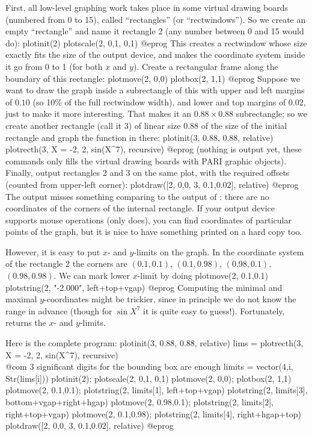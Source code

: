 First, all low-level graphing work takes place in some virtual drawing
boards (numbered from 0 to 15), called ``rectangles'' (or ``rectwindows'').
So we create an empty ``rectangle'' and name it rectangle 2 (any
number between 0 and 15 would do):
\bprog
plotinit(2)
plotscale(2, 0,1, 0,1)
@eprog
This creates a rectwindow whose size exactly fits the size of the output
device, and makes the coordinate system inside it go from 0 to 1 (for both
$x$ and $y$). Create a rectangular frame along the boundary of this rectangle:
\bprog
plotmove(2, 0,0)
plotbox(2, 1,1)
@eprog
Suppose we want to draw the graph inside a subrectangle of this with upper
and left margins of $0.10$ (so 10\% of the full rectwindow width), and
lower and top margins of $0.02$, just to make it more interesting. That
makes it an $0.88 \times 0.88$ subrectangle; so we create another rectangle
(call it 3) of linear size 0.88 of the size of the initial rectangle and
graph the function in there:
\bprog
plotinit(3, 0.88, 0.88, relative)
plotrecth(3, X = -2, 2, sin(X^7), recursive)
@eprog
(nothing is output yet, these commands only fills the virtual drawing
boards with PARI graphic objects). Finally, output rectangles 2 and 3 on
the same plot, with the required offsets (counted from upper-left corner):
\bprog
plotdraw([2, 0,0,  3, 0.1,0.02], relative)
@eprog
\noindent The output misses something comparing to the output of
: there are no coordinates of the corners of the internal
rectangle.  If your output device supports mouse operations (only
 does), you can find coordinates of particular points of the
graph, but it is nice to have something printed on a hard copy too.

However, it is easy to put $x$- and $y$-limits on the graph.  In the
coordinate system of the rectangle 2 the corners are $(0.1,0.1)$,
$(0.1,0.98)$, $(0.98,0.1)$, $(0.98,0.98)$.  We can mark lower $x$-limit by
doing
\bprog
plotmove(2, 0.1,0.1)
plotstring(2, "-2.000", left+top+vgap)
@eprog\noindent
Computing the minimal and maximal $y$-coordinates might be trickier, since
in principle we do not know the range in advance (though for $\sin X^7$ it
is quite easy to guess!). Fortunately,  returns the $x$- and
$y$-limits.

Here is the complete program:
\bprog
plotinit(3, 0.88, 0.88, relative)
lims = plotrecth(3, X = -2, 2, sin(X^7), recursive)
          \\ @com $3$ significant digits for the bounding box are enough
limits = vector(4,i, Str(lims[i]))
plotinit(2);      plotscale(2, 0,1, 0,1)
plotmove(2, 0,0); plotbox(2, 1,1)
plotmove(2, 0.1,0.1);
plotstring(2, limits[1], left+top+vgap)
plotstring(2, limits[3], bottom+vgap+right+hgap)
plotmove(2, 0.98,0.1); plotstring(2, limits[2], right+top+vgap)
plotmove(2, 0.1,0.98); plotstring(2, limits[4], right+hgap+top)
plotdraw([2, 0,0,  3, 0.1,0.02], relative)
@eprog

